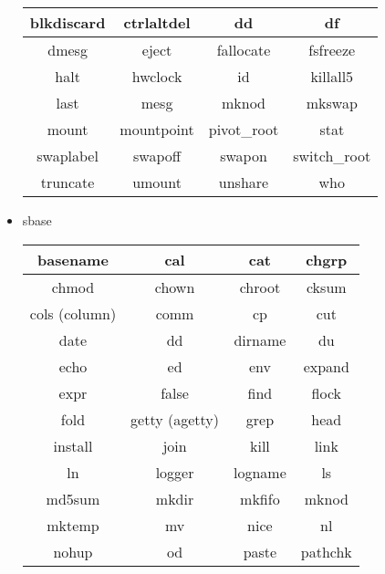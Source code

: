 \begin{itemize}
\begin{center}
            \begin{tabular}{|c|c|c|c|}
                \hline
                blkdiscard & ctrlaltdel & dd & df \\
                \hline
                dmesg & eject & fallocate & fsfreeze \\
                \hline
                halt & hwclock & id & killall5 \\
                \hline
                last & mesg & mknod & mkswap \\
                \hline
                mount & mountpoint & pivot\_root & stat \\
                \hline
                swaplabel & swapoff & swapon & switch\_root \\
                \hline
                truncate & umount & unshare & who \\
                \hline
            \end{tabular}
        \end{center}
    \item sbase
        \begin{center}
            \begin{tabular}{|c|c|c|c|}
                \hline
                basename & cal & cat & chgrp \\
                \hline
                chmod & chown & chroot & cksum \\
                \hline
                cols (column) & comm & cp & cut \\
                \hline
                date & dd & dirname & du \\
                \hline
                echo & ed & env & expand \\
                \hline
                expr & false & find & flock \\
                \hline
                fold & getty (agetty) & grep & head \\
                \hline
                install & join & kill & link \\
                \hline
                ln & logger & logname & ls \\
                \hline
                md5sum & mkdir & mkfifo & mknod \\
                \hline
                mktemp & mv & nice & nl \\
                \hline
                nohup & od & paste & pathchk \\
                \hline

\end{tabular}
\end{center}
\end{itemize}
